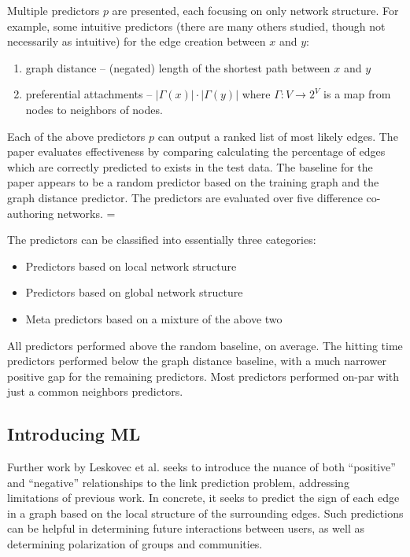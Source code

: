 \documentclass[letterpaper, 10 pt, conference]{ieeeconf}  %
\begin{document}
Multiple predictors $p$ are presented, each focusing on only network structure. For example, some intuitive predictors (there are many others studied, though not necessarily as intuitive) for the edge creation between $x$ and $y$:

\begin{enumerate}
\item graph distance -- (negated) length of the shortest path between $x$ and $y$
\item preferential attachments -- $|\Gamma(x)| \cdot |\Gamma(y)|$ where $\Gamma: V \to 2^V$ is a map from nodes to neighbors of nodes.
\end{enumerate}

Each of the above predictors $p$ can output a ranked list of most likely edges. The paper evaluates effectiveness by comparing calculating the percentage of edges which are correctly predicted to exists in the test data. The baseline for the paper appears to be a random predictor based on the training graph and the graph distance predictor. The predictors are evaluated over five difference co-authoring networks. =

The predictors can be classified into essentially three categories:

\begin{itemize}
\item Predictors based on local network structure
\item Predictors based on global network structure
\item Meta predictors based on a mixture of the above two 
\end{itemize}

All predictors performed above the random baseline, on average. The hitting time predictors performed below the graph distance baseline, with a much narrower positive gap for the remaining predictors. Most predictors performed on-par with just a common neighbors predictors.

\subsection{Introducing ML}

Further work by Leskovec et al. \cite{Leskovec:2010:PPN:1772690.1772756} seeks to introduce the nuance of both ``positive'' and ``negative'' relationships to the link prediction problem, addressing limitations of previous work. In concrete, it seeks to predict the sign of each edge in a graph based on the local structure of the surrounding edges. Such predictions can be helpful in determining future interactions between users, as well as determining polarization of groups and communities. 
\end{document}
